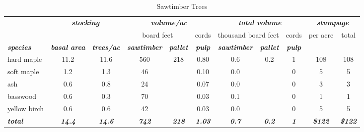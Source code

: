 \documentclass[landscape]{article}
\begin{document}
\begin{table}[H]

\caption{\label{tab:unnamed-chunk-54}Sawtimber Trees}
\fontsize{10}{12}\selectfont
\begin{tabular}[t]{lcccccccccc}
\toprule
\multicolumn{1}{c}{\em{\textbf{ }}} & \multicolumn{2}{c}{\em{\textbf{stocking}}} & \multicolumn{3}{c}{\em{\textbf{volume/ac }}} & \multicolumn{3}{c}{\em{\textbf{total volume}}} & \multicolumn{2}{c}{\em{\textbf{stumpage}}} \\
\cmidrule(l{3pt}r{3pt}){2-3} \cmidrule(l{3pt}r{3pt}){4-6} \cmidrule(l{3pt}r{3pt}){7-9} \cmidrule(l{3pt}r{3pt}){10-11}
\multicolumn{3}{c}{ } & \multicolumn{2}{c}{board feet} & \multicolumn{1}{c}{cords} & \multicolumn{2}{c}{thousand board feet} & \multicolumn{1}{c}{cords} & \multicolumn{1}{c}{per acre} & \multicolumn{1}{c}{total} \\
\cmidrule(l{3pt}r{3pt}){4-5} \cmidrule(l{3pt}r{3pt}){6-6} \cmidrule(l{3pt}r{3pt}){7-8} \cmidrule(l{3pt}r{3pt}){9-9} \cmidrule(l{3pt}r{3pt}){10-10} \cmidrule(l{3pt}r{3pt}){11-11}
\rowcolor[HTML]{DCDCDC}  \em{\textbf{species}} & \em{\textbf{basal area}} & \em{\textbf{trees/ac}} & \em{\textbf{sawtimber}} & \em{\textbf{pallet}} & \em{\textbf{pulp}} & \em{\textbf{sawtimber}} & \em{\textbf{pallet}} & \em{\textbf{pulp}} & \em{\textbf{ }} & \em{\textbf{ }}\\
\midrule
\rowcolor{gray!6}  hard maple & 11.2 & 11.6 & 560 & 218 & 0.80 & 0.6 & 0.2 & 1 & 108 & 108\\
 
soft maple & 1.2 & 1.3 & 46 &  & 0.10 & 0.0 &  & 0 & 5 & 5\\
 
\rowcolor{gray!6}  ash & 0.6 & 0.8 & 24 &  & 0.07 & 0.0 &  & 0 & 3 & 3\\
 
basswood & 0.6 & 0.3 & 70 &  & 0.03 & 0.1 &  & 0 & 1 & 1\\
 
\rowcolor{gray!6}  yellow birch & 0.6 & 0.6 & 42 &  & 0.03 & 0.0 &  & 0 & 5 & 5\\
 
\rowcolor[HTML]{DCDCDC}  \em{\textbf{total}} & \em{\textbf{14.4}} & \em{\textbf{14.6}} & \em{\textbf{742}} & \em{\textbf{218}} & \em{\textbf{1.03}} & \em{\textbf{0.7}} & \em{\textbf{0.2}} & \em{\textbf{1}} & \em{\textbf{\$122}} & \em{\textbf{\$122}}\\
\bottomrule
\end{tabular}
\end{table}
\end{document}
